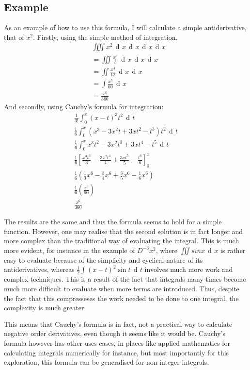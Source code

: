 \documentclass{article}
\DeclareMathOperator{\di}{\,d\!}
\newcommand*\Eval[3]{\left[#1\right]_{#2}^{#3}}
\begin{document}
\subsection{Example}
As an example of how to use this formula, I will calculate a simple antiderivative,
that of $x^2$. Firstly, using the simple method of integration.
\begin{align*}
	&\iiiint x^2 \di x\di x\di x\di x \\
	&=\iiint \frac{x^3}{3} \di x\di x\di x \\
	&=\iint \frac{x^4}{12}\di x\di x \\
	&=\int \frac{x^5}{60} \di x \\
	&=\frac{x^6}{360}
\end{align*}
And secondly, using Cauchy's formula for integration:
\begin{gather*}
	\frac{1}{3!}\int_0^x \left(x-t\right)^3 t^2 \di t \\
	\frac{1}{6}\int_0^x \left(x^3 - 3x^2t + 3xt^2 - t^3\right)t^2 \di t \\
	\frac{1}{6}\int_0^x x^3t^2 - 3x^2t^3 + 3xt^4 - t^5 \di t \\
	\frac{1}{6} \Eval{\frac{x^3t^3}{3} - \frac{3x^2t^4}{4} + \frac{3xt^5}{5} - \frac{t^6}{6}}{0}{x} \\
	\frac{1}{6} \left(\frac{1}{3}x^6 - \frac{3}{4} x^6 + \frac{3}{5} x^6 - \frac{1}{6}x^6 \right) \\
	\frac{1}{6} \left(\frac{x^6}{60} \right) \\
	\frac{x^6}{360}
\end{gather*}

The results are the same and thus the formula seems to hold for a simple
function. However, one may realise that the second solution is in fact longer
and more complex than the traditional way of evaluating the integral. This is
much more evident, for instance in the example of $D^{-3} x^2$, where $\iiint
sin x \di x$ is rather easy to evaluate because of the simplicity and cyclical
nature of its antiderivatives, whereas $\frac{1}{2}\int \left(x-t\right)^2 \sin
t\di t$ involves much more work and complex techniques. This is a result of the
fact that integrals many times become much more difficult to evaluate when more
terms are introduced. Thus, despite the fact that this compresseses the work
needed to be done to one integral, the complexity is much greater.

This means that Cauchy's formula is in fact, not a practical way to calculate
negative order derivatives, even though it seems like it would be. Cauchy's
formula however has other uses cases, in places like applied mathematics for
calculating integrals numerically for instance, but most importantly for this
exploration, this formula can be generalised for non-integer integrals.
\end{document}
